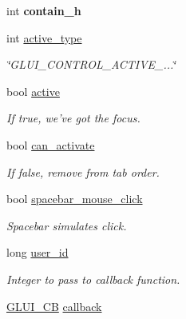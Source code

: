 \begin{DoxyCompactItemize}
\item 
\hypertarget{class_g_l_u_i___control_afc9111c158e729b1e1630d4d9cd6ee1a}{int {\bfseries contain\+\_\+h}}\label{class_g_l_u_i___control_afc9111c158e729b1e1630d4d9cd6ee1a}

\item 
int \hyperlink{class_g_l_u_i___control_ab9864db034526ddd5bbff94a5fb3ee9b}{active\+\_\+type}
\begin{DoxyCompactList}\small\item\em \char`\"{}\+G\+L\+U\+I\+\_\+\+C\+O\+N\+T\+R\+O\+L\+\_\+\+A\+C\+T\+I\+V\+E\+\_\+...\char`\"{} \end{DoxyCompactList}\item 
\hypertarget{class_g_l_u_i___control_ad285387e771b46fb294935f68e967a77}{bool \hyperlink{class_g_l_u_i___control_ad285387e771b46fb294935f68e967a77}{active}}\label{class_g_l_u_i___control_ad285387e771b46fb294935f68e967a77}

\begin{DoxyCompactList}\small\item\em If true, we've got the focus. \end{DoxyCompactList}\item 
\hypertarget{class_g_l_u_i___control_a2484b0899bd5b56673a73387c9c530a7}{bool \hyperlink{class_g_l_u_i___control_a2484b0899bd5b56673a73387c9c530a7}{can\+\_\+activate}}\label{class_g_l_u_i___control_a2484b0899bd5b56673a73387c9c530a7}

\begin{DoxyCompactList}\small\item\em If false, remove from tab order. \end{DoxyCompactList}\item 
\hypertarget{class_g_l_u_i___control_a023da130fb762f944077c55d90aec839}{bool \hyperlink{class_g_l_u_i___control_a023da130fb762f944077c55d90aec839}{spacebar\+\_\+mouse\+\_\+click}}\label{class_g_l_u_i___control_a023da130fb762f944077c55d90aec839}

\begin{DoxyCompactList}\small\item\em Spacebar simulates click. \end{DoxyCompactList}\item 
long \hyperlink{class_g_l_u_i___control_a6c88b7c72b0800f88a5d4cda4868c8b6}{user\+\_\+id}
\begin{DoxyCompactList}\small\item\em Integer to pass to callback function. \end{DoxyCompactList}\item 
\hypertarget{class_g_l_u_i___control_a96060fe0cc6d537e736dd6eef78e24ab}{\hyperlink{class_g_l_u_i___c_b}{G\+L\+U\+I\+\_\+\+C\+B} \hyperlink{class_g_l_u_i___control_a96060fe0cc6d537e736dd6eef78e24ab}{callback}}\label{class_g_l_u_i___control_a96060fe0cc6d537e736dd6eef78e24ab}


\end{DoxyCompactItemize}
